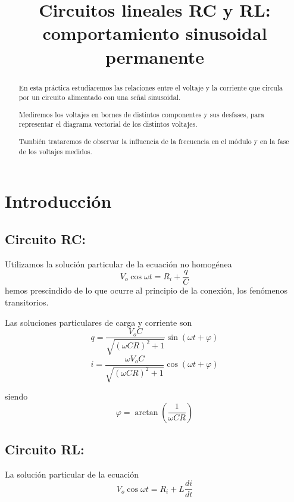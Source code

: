 \documentclass[a4paper,12pt,spanish]{article}
\begin{document}
	
	
	\title{Circuitos lineales RC y RL: comportamiento sinusoidal permanente}
	
	\date{}
	
	\maketitle
	
	
	
	\begin{abstract} %
		
	En esta práctica estudiaremos las relaciones entre el voltaje y la corriente que circula por un circuito alimentado con una señal sinusoidal.
	
	Mediremos los voltajes en bornes de distintos componentes y sus desfases, para representar el diagrama vectorial de los distintos voltajes.
	
	También trataremos de observar la influencia de la frecuencia en el módulo y en la fase de los voltajes medidos.
		
	\end{abstract}

\section{Introducción}

\subsection*{Circuito RC:}

Utilizamos la solución particular de la ecuación no homogénea
\[V_o \cos \omega t = R_i + \frac{q}{C} \]
hemos prescindido de lo que ocurre al principio de la conexión, los fenómenos transitorios.

Las soluciones particulares de carga y corriente son 
\[q = \frac{V_o C}{\sqrt{(\omega C R)^2 + 1}} \sin (\omega t + \varphi)\]
\[i = \frac{\omega V_o C}{\sqrt{(\omega C R)^2+ 1}}\cos ( \omega t + \varphi ) \]

siendo 
\[ \varphi = \arctan\left(\frac{1}{\omega C R}\right) \]


\subsection*{Circuito RL:}

La solución particular de la ecuación
\[V_o \cos \omega t= R_i + L \frac{di}{dt}\]
\end{document}
